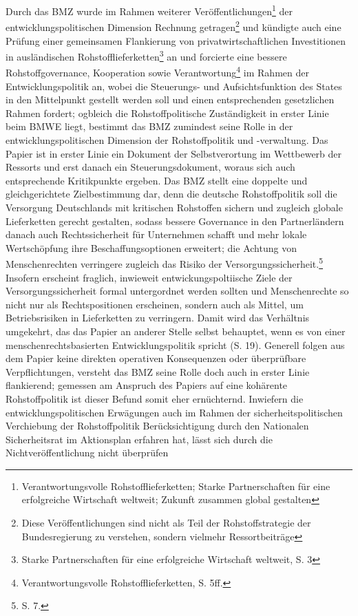 \documentclass[12pt,a4paper,oneside]{book} %
\begin{document}
Durch das BMZ wurde im Rahmen weiterer Veröffentlichungen\footnote{Verantwortungsvolle Rohstofflieferketten; Starke Partnerschaften für eine erfolgreiche Wirtschaft weltweit; Zukunft zusammen global gestalten} der entwicklungspolitischen Dimension Rechnung getragen\footnote{Diese Veröffentlichungen sind nicht als Teil der Rohstoffstrategie der Bundesregierung zu verstehen, sondern vielmehr Ressortbeiträge} und kündigte auch eine Prüfung einer gemeinsamen Flankierung von privatwirtschaftlichen Investitionen in ausländischen Rohstofflieferketten\footnote{ Starke Partnerschaften für eine erfolgreiche Wirtschaft weltweit, S. 3} an und forcierte eine bessere Rohstoffgovernance, Kooperation sowie Verantwortung\footnote{Verantwortungsvolle Rohstofflieferketten, S. 5ff.} im Rahmen der Entwicklungspolitik an, wobei die Steuerungs- und Aufsichtsfunktion des States in den Mittelpunkt gestellt werden soll und einen entsprechenden gesetzlichen Rahmen fordert; ogbleich die Rohstoffpolitische Zuständigkeit in erster Linie beim BMWE liegt, bestimmt das BMZ zumindest seine Rolle in der entwicklungspolitischen Dimension der Rohstoffpolitik und -verwaltung. Das Papier ist in erster Linie ein Dokument der Selbstverortung im Wettbewerb der Ressorts und erst danach ein Steuerungsdokument, woraus sich auch entsprechende Kritikpunkte ergeben. Das BMZ stellt eine doppelte und gleichgerichtete Zielbestimmung dar, denn die deutsche Rohstoffpolitik soll die Versorgung Deutschlands mit kritischen Rohstoffen sichern und zugleich globale Lieferketten gerecht gestalten, sodass bessere Governance in den Partnerländern danach auch Rechtssicherheit für Unternehmen schafft und mehr lokale Wertschöpfung ihre Beschaffungsoptionen erweitert; die Achtung von Menschenrechten verringere zugleich das Risiko der Versorgungssicherheit.\footnote{S. 7.} Insofern erscheint fraglich, inwieweit entwickungspoltiische Ziele der Versorgungssicherheit formal untergordnet werden sollten und Menschenrechte so  nicht nur als Rechtspositionen erscheinen, sondern auch als Mittel, um Betriebsrisiken in Lieferketten zu verringern. Damit wird das Verhältnis umgekehrt, das das Papier an anderer Stelle selbst behauptet, wenn es von einer menschenrechtsbasierten Entwicklungspolitik spricht (S. 19). Generell folgen aus dem Papier keine direkten operativen Konsequenzen oder überprüfbare Verpflichtungen, versteht das BMZ seine Rolle doch auch in erster Linie flankierend; gemessen am Anspruch des Papiers auf eine kohärente Rohstoffpolitik ist dieser Befund somit eher ernüchternd. Inwiefern die entwicklungspolitischen Erwägungen auch im Rahmen der sicherheitspolitischen Verchiebung der Rohstoffpolitik Berücksichtigung durch den Nationalen Sicherheitsrat im Aktionsplan erfahren hat, lässt sich durch die Nichtveröffentlichung nicht überprüfen
\end{document}
